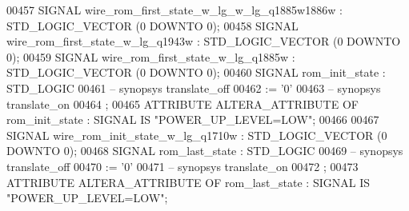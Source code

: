 \begin{DoxyCode}
{00457      \textcolor{keywordflow}{SIGNAL}  \textcolor{vhdlchar}{wire_rom_first_state_w_lg_w_lg_q1885w1886w} \textcolor{vhdlchar}{:}   \textcolor{comment}{STD\_LOGIC\_VECTOR} \textcolor{vhdlchar}{(}\textcolor{vhdllogic}{}\textcolor{vhdllogic}{0} \textcolor{keywordflow}{DOWNTO} \textcolor{vhdllogic}{}\textcolor{vhdllogic}{0}\textcolor{vhdlchar}{)};
00458      \textcolor{keywordflow}{SIGNAL}  \textcolor{vhdlchar}{wire_rom_first_state_w_lg_q1943w}   \textcolor{vhdlchar}{:}   \textcolor{comment}{STD\_LOGIC\_VECTOR} \textcolor{vhdlchar}{(}\textcolor{vhdllogic}{}\textcolor{vhdllogic}{0} \textcolor{keywordflow}{DOWNTO} \textcolor{vhdllogic}{}\textcolor{vhdllogic}{0}\textcolor{vhdlchar}{)};
00459      \textcolor{keywordflow}{SIGNAL}  \textcolor{vhdlchar}{wire_rom_first_state_w_lg_q1885w}   \textcolor{vhdlchar}{:}   \textcolor{comment}{STD\_LOGIC\_VECTOR} \textcolor{vhdlchar}{(}\textcolor{vhdllogic}{}\textcolor{vhdllogic}{0} \textcolor{keywordflow}{DOWNTO} \textcolor{vhdllogic}{}\textcolor{vhdllogic}{0}\textcolor{vhdlchar}{)};
00460      \textcolor{keywordflow}{SIGNAL}  \textcolor{vhdlchar}{rom_init_state} \textcolor{vhdlchar}{:}   \textcolor{comment}{STD\_LOGIC}
00461 \textcolor{keyword}{     -- synopsys translate\_off}
00462       \textcolor{vhdlchar}{:=} \textcolor{vhdlchar}{'}\textcolor{vhdllogic}{}\textcolor{vhdllogic}{0}\textcolor{vhdlchar}{'}
00463 \textcolor{keyword}{     -- synopsys translate\_on}
00464      ;
00465      \textcolor{keywordflow}{ATTRIBUTE} \textcolor{vhdlchar}{ALTERA_ATTRIBUTE} \textcolor{keywordflow}{OF} \textcolor{vhdlchar}{rom_init_state} \textcolor{vhdlchar}{:} \textcolor{keywordflow}{SIGNAL} \textcolor{keywordflow}{IS} \textcolor{keyword}{"POWER\_UP\_LEVEL=LOW"};
00466 
00467      \textcolor{keywordflow}{SIGNAL}  \textcolor{vhdlchar}{wire_rom_init_state_w_lg_q1710w}    \textcolor{vhdlchar}{:}   \textcolor{comment}{STD\_LOGIC\_VECTOR} \textcolor{vhdlchar}{(}\textcolor{vhdllogic}{}\textcolor{vhdllogic}{0} \textcolor{keywordflow}{DOWNTO} \textcolor{vhdllogic}{}\textcolor{vhdllogic}{0}\textcolor{vhdlchar}{)};
00468      \textcolor{keywordflow}{SIGNAL}  \textcolor{vhdlchar}{rom_last_state} \textcolor{vhdlchar}{:}   \textcolor{comment}{STD\_LOGIC}
00469 \textcolor{keyword}{     -- synopsys translate\_off}
00470       \textcolor{vhdlchar}{:=} \textcolor{vhdlchar}{'}\textcolor{vhdllogic}{}\textcolor{vhdllogic}{0}\textcolor{vhdlchar}{'}
00471 \textcolor{keyword}{     -- synopsys translate\_on}
00472      ;
00473      \textcolor{keywordflow}{ATTRIBUTE} \textcolor{vhdlchar}{ALTERA_ATTRIBUTE} \textcolor{keywordflow}{OF} \textcolor{vhdlchar}{rom_last_state} \textcolor{vhdlchar}{:} \textcolor{keywordflow}{SIGNAL} \textcolor{keywordflow}{IS} \textcolor{keyword}{"POWER\_UP\_LEVEL=LOW"};
}
\end{DoxyCode}
